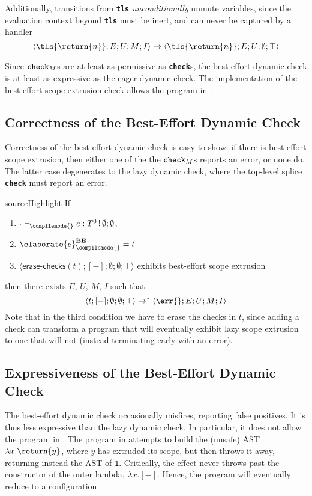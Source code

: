 Additionally, transitions from \textbf{\texttt{tls}} \textit{unconditionally} unmute variables, since the evaluation context beyond \textbf{\texttt{tls}} must be inert, and can never be captured by a handler
\[\langle \tls{\return{n}}; E; U; M; I \rangle \to \langle \tls{\return{n}}; E; U; \emptyset; \top \rangle\]

Since $\textbf{\texttt{check}}_M$s are at least as permissive as \textbf{\texttt{check}}s, the best-effort dynamic check is at least as expressive as the eager dynamic check. The implementation of the best-effort scope extrusion check allows the program in . 

\subsection{Correctness of the Best-Effort Dynamic Check}\label{subsection:best-effort-correct}
Correctness of the best-effort dynamic check is easy to show: if there is best-effort scope extrusion, then either one of the the $\textbf{\texttt{check}}_M$s reports an error, or none do. The latter case degenerates to the lazy dynamic check, where the top-level splice \textbf{\texttt{check}} must report an error. 

\begin{theorem}{sourceHighlight} If 
  \begin{enumerate}
    \item $\cdot \vdash_{\compilemode{}} e: T^0 \, ! \, \emptyset;\emptyset$, 
    \item $\elaborate{e}_{\compilemode{}}^{\textbf{BE}} = t$
    \item $\langle \textsf{erase-checks}(t); [-]; \emptyset; \emptyset; \top \rangle$ exhibits best-effort scope extrusion 
  \end{enumerate}
  then there exists $E$, $U$, $M$, $I$ such that \[\langle t; [-]; \emptyset; \emptyset; \top \rangle \to^{*}\langle \err{}; E; U; M; I \rangle\]
Note that in the third condition we have to erase the checks in $t$, since adding a check can transform a program that will eventually exhibit lazy scope extrusion to one that will not (instead terminating early with an error).
\end{theorem}

\subsection{Expressiveness of the Best-Effort Dynamic Check}\label{subsection:best-effort-expressive}
The best-effort dynamic check occasionally misfires, reporting false positives. It is thus less expressive than the lazy dynamic check. In particular, it does not allow the program in . The program in  attempts to build the (unsafe) AST $\lambda x.\return{y}$, where $y$ has extruded its scope, but then throws it away, returning instead the AST of \texttt{1}. Critically, the effect never throws past the constructor of the outer lambda, $\lambda x. [-]$. Hence, the program will eventually reduce to a configuration 

